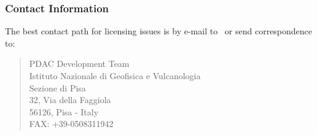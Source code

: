 \newpage
\subsubsection*{Contact Information}

The best contact path for licensing issues is by e-mail to \PDACADDRESS\ 
or send correspondence to:
\begin{verse}
                             PDAC Development Team\\
                             Istituto Nazionale di Geofisica e Vulcanologia\\
			     Sezione di Pisa\\
                             32, Via della Faggiola\\
			     56126, Pisa - Italy\\
                             FAX: +39-0508311942
\end{verse}


